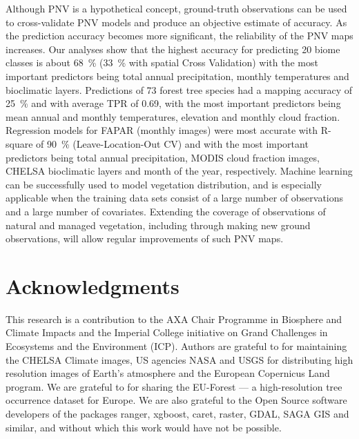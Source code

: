 \documentclass[fleqn,10pt,lineno]{wlpeerj} %
\begin{document}
Although PNV is a hypothetical concept, ground-truth observations can be used to cross-validate PNV models and produce an objective estimate of accuracy. As the prediction accuracy becomes more significant, the reliability of the PNV maps increases. Our analyses show that the highest accuracy for predicting 20 biome classes is about \SI{68}{\percent} (\SI{33}{\percent} with spatial Cross Validation) with the most important predictors being total annual precipitation, monthly temperatures and bioclimatic layers. Predictions of 73 forest tree species had a mapping accuracy of \SI{25}{\percent} and with average TPR of 0.69, with the most important predictors being mean annual and monthly temperatures, elevation and monthly cloud fraction. Regression models for FAPAR (monthly images) were most accurate with R-square of \SI{90}{\percent} (Leave-Location-Out CV) and with the most important predictors being total annual precipitation, MODIS cloud fraction images, CHELSA bioclimatic layers and month of the year, respectively. Machine learning can be successfully used to model vegetation distribution, and is especially applicable when the training data sets consist of a large number of observations and a large number of covariates. Extending the coverage of observations of natural and managed vegetation, including through making new ground observations, will allow regular improvements of such PNV maps. \par

\section*{Acknowledgments}
This research is a contribution to the AXA Chair Programme in Biosphere and Climate Impacts and the Imperial College initiative on Grand Challenges in Ecosystems and the Environment (ICP). Authors are grateful to \citet{karger2017climatologies} for maintaining the CHELSA Climate images, US agencies NASA and USGS for distributing high resolution images of Earth's atmosphere and the European Copernicus Land program. We are grateful to \citet{mauri2017eu} for sharing the EU-Forest --- a high-resolution tree occurrence dataset for Europe. We are also grateful to the Open Source software developers of the packages \textsf{ranger}, \textsf{xgboost}, \textsf{caret}, \textsf{raster}, \textsf{GDAL}, \textsf{SAGA GIS} and similar, and without which this work would have not be possible.


\end{document}

